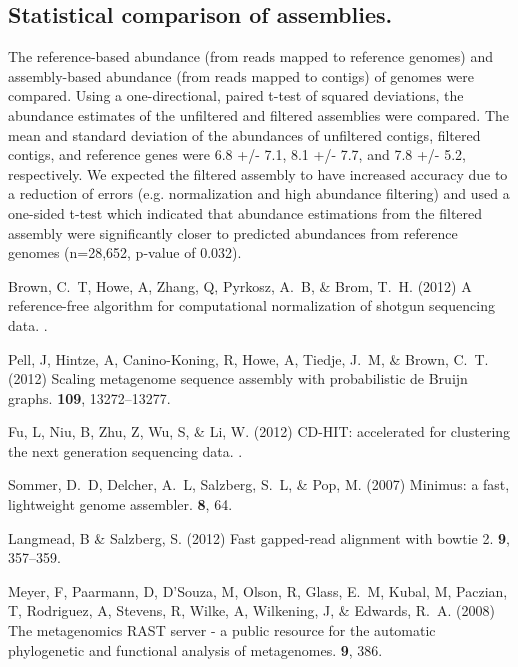 \documentclass{pnastwo}
\begin{document}
\begin{article}
\subsection*{Statistical comparison of assemblies.}
The reference-based abundance (from reads mapped to reference genomes)
and assembly-based abundance (from reads mapped to contigs) of genomes
were compared.  Using a one-directional, paired t-test of squared
deviations, the abundance estimates of the unfiltered and filtered
assemblies were compared.  The mean and standard deviation of 
the abundances of unfiltered contigs, filtered contigs, and reference genes
were 6.8 +/- 7.1, 8.1 +/- 7.7, and 7.8 +/- 5.2, respectively.  We expected the 
filtered assembly to have increased accuracy due to a reduction of errors (e.g. normalization
and high abundance filtering) and used a one-sided t-test which
indicated that abundance estimations from the filtered assembly were
significantly closer to predicted abundances from reference genomes
(n=28,652, p-value of 0.032).


\begin{thebibliography}{1}

Brown, C.~T, Howe, A, Zhang, Q, Pyrkosz, A.~B,  \& Brom, T.~H.
\newblock (2012) A reference-free algorithm for computational normalization of
  shotgun sequencing data.
.

Pell, J, Hintze, A, Canino-Koning, R, Howe, A, Tiedje, J.~M,  \& Brown, C.~T.
\newblock (2012) {Scaling metagenome sequence assembly with probabilistic de
  Bruijn graphs}.
 {\bf 109}, 13272--13277.

Fu, L, Niu, B, Zhu, Z, Wu, S,  \& Li, W.
\newblock (2012) {CD-HIT: accelerated for clustering the next generation
  sequencing data.}
.

Sommer, D.~D, Delcher, A.~L, Salzberg, S.~L,  \& Pop, M.
\newblock (2007) Minimus: a fast, lightweight genome assembler.
 {\bf 8}, 64.

Langmead, B \& Salzberg, S.
\newblock (2012) Fast gapped-read alignment with bowtie 2.
 {\bf 9}, 357--359.

Meyer, F, Paarmann, D, D'Souza, M, Olson, R, Glass, E.~M, Kubal, M, Paczian, T,
  Rodriguez, A, Stevens, R, Wilke, A, Wilkening, J,  \& Edwards, R.~A.
\newblock (2008) {The metagenomics RAST server - a public resource for the
  automatic phylogenetic and functional analysis of metagenomes.}
 {\bf 9}, 386.

\end{thebibliography}

\end{article}
\end{document}
